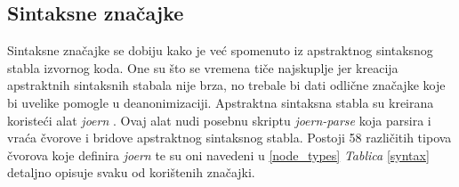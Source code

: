 \subsection{Sintaksne značajke}
Sintaksne značajke se dobiju kako je već spomenuto iz apstraktnog sintaksnog stabla izvornog koda. One su što se vremena tiče najskuplje jer kreacija apstraktnih sintaksnih stabala nije brza, no trebale bi dati odlične značajke koje bi uvelike pomogle u deanonimizaciji. Apstraktna sintaksna stabla su kreirana koristeći alat \textit{joern} \cite{joern}. Ovaj alat nudi posebnu skriptu \textit{joern-parse} koja parsira i vraća čvorove i bridove apstraktnog sintaksnog stabla. Postoji 58 različitih tipova čvorova koje definira \textit{joern} te su oni navedeni u \ref{node_types} \textit{Tablica} \ref{syntax} detaljno opisuje svaku od korištenih značajki.

